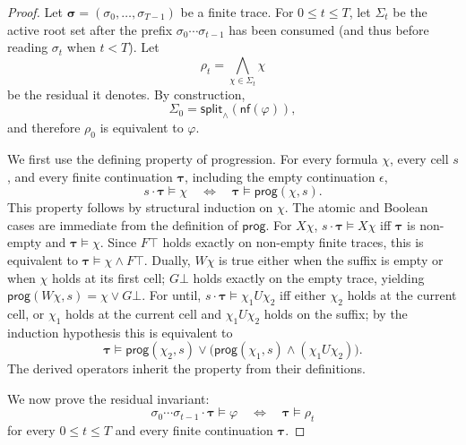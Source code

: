 \begin{proof}
Let $\boldsymbol{\sigma}=(\sigma_0,\ldots,\sigma_{T-1})$ be a finite trace. For $0\leq t\leq T$, let $\Sigma_t$ be the active root set after the prefix $\sigma_0\cdots\sigma_{t-1}$ has been consumed (and thus before reading $\sigma_t$ when $t<T$). Let
\[
    \rho_t = \bigwedge_{\chi\in\Sigma_t}\chi
\]
be the residual it denotes. By construction,
\[
    \Sigma_0=\mathsf{split}_\wedge(\mathsf{nf}(\varphi)),
\]
and therefore $\rho_0$ is equivalent to $\varphi$.

We first use the defining property of progression. For every formula $\chi$, every cell $s$, and every finite continuation $\boldsymbol{\tau}$, including the empty continuation $\epsilon$,
\begin{equation}
\label{eq:progression-step}
    s\cdot\boldsymbol{\tau}\models\chi
    \quad\Longleftrightarrow\quad
    \boldsymbol{\tau}\models\mathsf{prog}(\chi,s).
\end{equation}
This property follows by structural induction on $\chi$. The atomic and Boolean cases are immediate from the definition of $\mathsf{prog}$. For $X\chi$, $s\cdot\boldsymbol{\tau}\models X\chi$ iff $\boldsymbol{\tau}$ is non-empty and $\boldsymbol{\tau}\models\chi$. Since $F\top$ holds exactly on non-empty finite traces, this is equivalent to $\boldsymbol{\tau}\models\chi\land F\top$. Dually, $W\chi$ is true either when the suffix is empty or when $\chi$ holds at its first cell; $G\bot$ holds exactly on the empty trace, yielding $\mathsf{prog}(W\chi,s)=\chi\lor G\bot$. For until, $s\cdot\boldsymbol{\tau}\models\chi_1U\chi_2$ iff either $\chi_2$ holds at the current cell, or $\chi_1$ holds at the current cell and $\chi_1U\chi_2$ holds on the suffix; by the induction hypothesis this is equivalent to
\[
    \boldsymbol{\tau}\models
    \mathsf{prog}(\chi_2,s)\lor
    \bigl(\mathsf{prog}(\chi_1,s)\land(\chi_1U\chi_2)\bigr).
\]
The derived operators inherit the property from their definitions.

We now prove the residual invariant:
\begin{equation}
\label{eq:rulerunner-residual-invariant}
    \sigma_0\cdots\sigma_{t-1}\cdot\boldsymbol{\tau}\models\varphi
    \quad\Longleftrightarrow\quad
    \boldsymbol{\tau}\models\rho_t
\end{equation}
for every $0\leq t\leq T$ and every finite continuation $\boldsymbol{\tau}$.


\end{proof}
